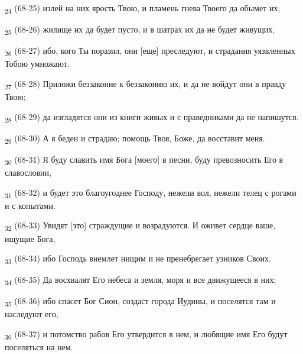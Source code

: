 \begin{tcolorbox}
\textsubscript{24} (68-25) излей на них ярость Твою, и пламень гнева Твоего да обымет их;
\end{tcolorbox}
\begin{tcolorbox}
\textsubscript{25} (68-26) жилище их да будет пусто, и в шатрах их да не будет живущих,
\end{tcolorbox}
\begin{tcolorbox}
\textsubscript{26} (68-27) ибо, кого Ты поразил, они [еще] преследуют, и страдания уязвленных Тобою умножают.
\end{tcolorbox}
\begin{tcolorbox}
\textsubscript{27} (68-28) Приложи беззаконие к беззаконию их, и да не войдут они в правду Твою;
\end{tcolorbox}
\begin{tcolorbox}
\textsubscript{28} (68-29) да изгладятся они из книги живых и с праведниками да не напишутся.
\end{tcolorbox}
\begin{tcolorbox}
\textsubscript{29} (68-30) А я беден и страдаю; помощь Твоя, Боже, да восставит меня.
\end{tcolorbox}
\begin{tcolorbox}
\textsubscript{30} (68-31) Я буду славить имя Бога [моего] в песни, буду превозносить Его в славословии,
\end{tcolorbox}
\begin{tcolorbox}
\textsubscript{31} (68-32) и будет это благоугоднее Господу, нежели вол, нежели телец с рогами и с копытами.
\end{tcolorbox}
\begin{tcolorbox}
\textsubscript{32} (68-33) Увидят [это] страждущие и возрадуются. И оживет сердце ваше, ищущие Бога,
\end{tcolorbox}
\begin{tcolorbox}
\textsubscript{33} (68-34) ибо Господь внемлет нищим и не пренебрегает узников Своих.
\end{tcolorbox}
\begin{tcolorbox}
\textsubscript{34} (68-35) Да восхвалят Его небеса и земля, моря и все движущееся в них;
\end{tcolorbox}
\begin{tcolorbox}
\textsubscript{35} (68-36) ибо спасет Бог Сион, создаст города Иудины, и поселятся там и наследуют его,
\end{tcolorbox}
\begin{tcolorbox}
\textsubscript{36} (68-37) и потомство рабов Его утвердится в нем, и любящие имя Его будут поселяться на нем.
\end{tcolorbox}
